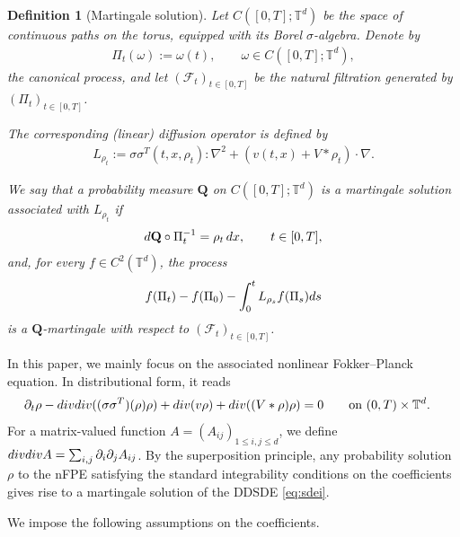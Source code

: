 \documentclass[10pt,a4paper]{amsart}
\numberwithin{equation}{section}
\newtheorem{definition}[theorem]{Definition}
\def\dif{{\mathord{{\rm d}}}}
\def\leq{\leqslant}
\def\div{\mathord{{\rm div}}}
\def\dif{{\mathord{{\rm d}}}}
\def\leq{\leqslant}
\def\div{\mathord{{\rm div}}}
\begin{document}
\begin{definition}[Martingale solution]
Let $C([0,T];\mathbb{T}^d)$ be the space of continuous paths on the torus,
equipped with its Borel $\sigma$-algebra. Denote by
\begin{align*}
\Pi_t(\omega):=\omega(t),
\qquad
\omega\in C([0,T];\mathbb{T}^d),
\end{align*}
the canonical process, and let $(\mathcal F_t)_{t\in[0,T]}$ be the natural
filtration generated by $(\Pi_t)_{t\in[0,T]}$.

The corresponding (linear)  diffusion operator is defined by
\begin{align*}
L_{\rho_t}:=  \sigma\sigma^{T}(t,x,\rho_t):\nabla^2+(v(t,x)+V*\rho_t)\cdot \nabla.    
\end{align*} 

We say that a probability measure $\mathbf Q$ on
$C([0,T];\mathbb{T}^d)$ is a martingale solution associated with
$L_{\rho_t}$ if
\begin{align*}
\dif\mathbf Q\circ \Pi_t^{-1} =\rho_t \,\dif x,
\qquad
t\in[0,T],
\end{align*}
and, for every $f\in C^2(\mathbb{T}^d)$, the process
\begin{align*}
     f( \Pi_t) -f(\Pi_0)-\int^t_0 L_{\rho_s}f( \Pi_s)\dif s
\end{align*}
is a $\mathbf Q$-martingale with respect to $(\mathcal F_t)_{t\in[0,T]}$.
\end{definition}

In this paper, we mainly focus on the associated nonlinear Fokker--Planck
equation. In distributional form, it reads
\begin{align}
\partial_t \rho-\div\div((\sigma\sigma^{T})(\rho) \rho)+\div(v\rho)+\div((V*\rho)\rho)&=0
\qquad
\text{on } (0,T)\times\mathbb{T}^d. 
\label{eq:fpe:i}
\end{align} 
For a matrix-valued function $A=(A_{ij})_{1\leq i,j\leq d}$, we define
$\div\div A=\sum_{i,j}\partial_i\partial_jA_{ij}$. 
By the superposition principle, any probability solution $\rho$ to the nFPE
  satisfying the standard integrability conditions on the
coefficients gives rise to a martingale solution of the DDSDE \eqref{eq:sdei}.

We  impose the following assumptions on the coefficients.
\end{document}
